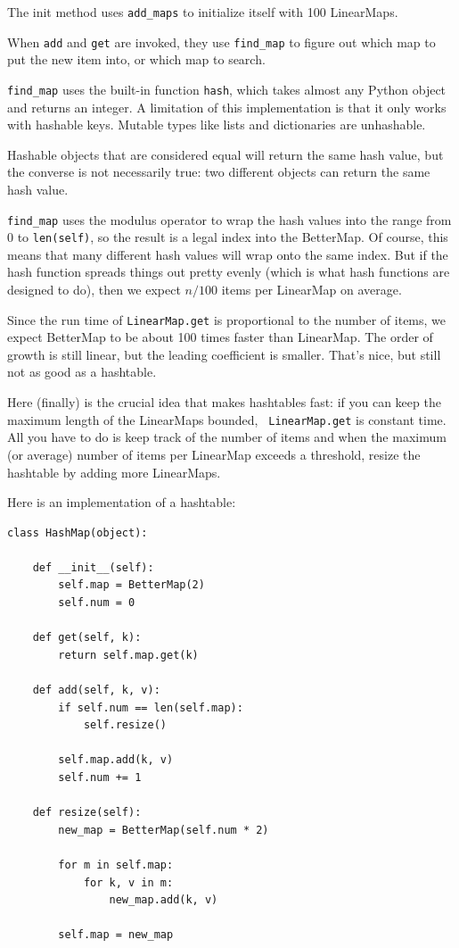 \documentclass[10pt]{book}
\begin{document}
The init method uses \verb"add_maps" to initialize itself with
100 LinearMaps.

When {\tt add} and {\tt get} are invoked,
they use \verb"find_map" to figure out which map to put the
new item into, or which map to search.  

\verb"find_map" uses the built-in function {\tt hash}, which takes
almost any Python object and returns an integer.  A limitation of this
implementation is that it only works with hashable keys.  Mutable
types like lists and dictionaries are unhashable.

Hashable objects that are considered equal will return the same hash value,
but the converse is not necessarily true: two different objects
can return the same hash value.

\verb"find_map" uses the modulus operator to wrap the hash values
into the range from 0 to {\tt len(self)}, so the result is a legal
index into the BetterMap.  Of course, this means that many different
hash values will wrap onto the same index.  But if the hash function
spreads things out pretty evenly (which is what hash functions
are designed to do), then we expect $n/100$ items per LinearMap
on average. 

Since the run time of {\tt LinearMap.get} is proportional to the
number of items, we expect BetterMap to be about 100 times faster
than LinearMap.  The order of growth is still linear, but the
leading coefficient is smaller.  That's nice, but still not
as good as a hashtable.

Here (finally) is the crucial idea that makes hashtables fast: if you
can keep the maximum length of the LinearMaps bounded, {\tt
  LinearMap.get} is constant time.  All you have to do is keep track
of the number of items and when the maximum (or average) number of
items per LinearMap exceeds a threshold, resize the hashtable by
adding more LinearMaps.

Here is an implementation of a hashtable:

\begin{verbatim}
class HashMap(object):

    def __init__(self):
        self.map = BetterMap(2)
        self.num = 0

    def get(self, k):
        return self.map.get(k)

    def add(self, k, v):
        if self.num == len(self.map):
            self.resize()

        self.map.add(k, v)
        self.num += 1

    def resize(self):
        new_map = BetterMap(self.num * 2)

        for m in self.map:
            for k, v in m:
                new_map.add(k, v)

        self.map = new_map
\end{verbatim}
\end{document}

